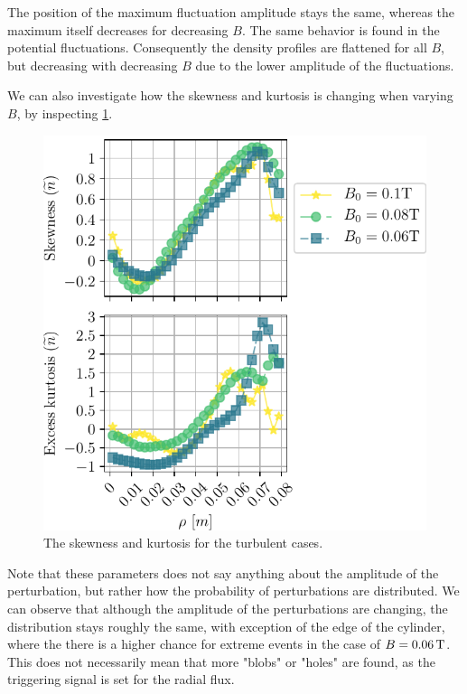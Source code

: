 The position of the maximum fluctuation amplitude stays the same, whereas the maximum itself decreases for decreasing $B$.
The same behavior is found in the potential fluctuations.
Consequently the density profiles are flattened for all $B$, but decreasing with decreasing $B$ due to the lower amplitude of the fluctuations.

We can also investigate how the skewness and kurtosis is changing when varying $B$, by inspecting \cref{fig:BScanSkewKurt}.
%
\begin{figure}[htb]
    \centering
    \includegraphics{fig/results/bScan/BScanSkewKurt}
    \caption{The skewness and kurtosis for the turbulent cases.}
    \label{fig:BScanSkewKurt}
\end{figure}
%
Note that these parameters does not say anything about the amplitude of the perturbation, but rather how the probability of perturbations are distributed.
We can observe that although the amplitude of the perturbations are changing, the distribution stays roughly the same, with exception of the edge of the cylinder, where the there is a higher chance for extreme events in the case of $B=0.06\, \text{T}$.
This does not necessarily mean that more "blobs" or "holes" are found, as the triggering signal is set for the radial flux.

